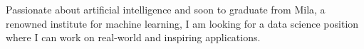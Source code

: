 

\begin{cvparagraph}




Passionate about artificial intelligence and soon to graduate from Mila, a renowned institute for machine learning, I am looking for a data science position where I can work on real-world and inspiring applications.


\end{cvparagraph}
